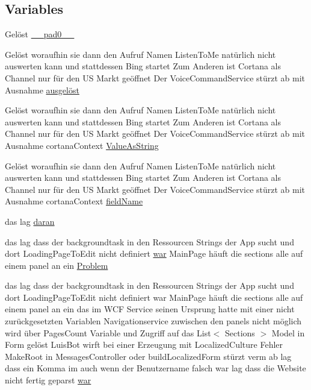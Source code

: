 \subsection*{Variables}
\begin{DoxyCompactItemize}
\item 
Gelöst \mbox{\hyperlink{_r_e_a_d_m_e_8txt_a38ccef022a886075e294ad30cbfcae20}{\+\_\+\+\_\+pad0\+\_\+\+\_\+}}
\item 
Gelöst woraufhin sie dann den Aufruf Namen Listen\+To\+Me natürlich nicht auswerten kann und stattdessen Bing startet Zum Anderen ist Cortana als Channel nur für den US Markt geöffnet Der Voice\+Command\+Service stürzt ab mit Ausnahme \mbox{\hyperlink{_r_e_a_d_m_e_8txt_ae87c321689a82617b1f79b2274e0c802}{ausgelöst}}
\item 
Gelöst woraufhin sie dann den Aufruf Namen Listen\+To\+Me natürlich nicht auswerten kann und stattdessen Bing startet Zum Anderen ist Cortana als Channel nur für den US Markt geöffnet Der Voice\+Command\+Service stürzt ab mit Ausnahme cortana\+Context \mbox{\hyperlink{_r_e_a_d_m_e_8txt_a5efed622080494c17160e34d1aa15886}{Value\+As\+String}}
\item 
Gelöst woraufhin sie dann den Aufruf Namen Listen\+To\+Me natürlich nicht auswerten kann und stattdessen Bing startet Zum Anderen ist Cortana als Channel nur für den US Markt geöffnet Der Voice\+Command\+Service stürzt ab mit Ausnahme cortana\+Context \mbox{\hyperlink{_r_e_a_d_m_e_8txt_a225ecf32ab26301c2eb46c45696e77a2}{field\+Name}}
\item 
das lag \mbox{\hyperlink{_r_e_a_d_m_e_8txt_a135543df2f8a787ac2ddeaf87194562c}{daran}}
\item 
das lag dass der backgroundtask in den Ressourcen Strings der App sucht und dort Loading\+Page\+To\+Edit nicht definiert \mbox{\hyperlink{_r_e_a_d_m_e_8txt_a2a72fc7da943588cba8c302409b22e53}{war}} Main\+Page häuft die sections alle auf einem panel an ein \mbox{\hyperlink{_r_e_a_d_m_e_8txt_a86dd00a8c1f3448e32e23bece4a957d6}{Problem}}
\item 
das lag dass der backgroundtask in den Ressourcen Strings der App sucht und dort Loading\+Page\+To\+Edit nicht definiert war Main\+Page häuft die sections alle auf einem panel an ein das im W\+CF Service seinen Ursprung hatte mit einer nicht zurückgesetzten Variablen Navigationservice zuwischen den panels nicht möglich wird über Pages\+Count Variable und Zugriff auf das List$<$ Sections $>$ Model in Form gelöst Luis\+Bot wirft bei einer Erzeugung mit Localized\+Culture Fehler Make\+Root in Messages\+Controller oder build\+Localized\+Form stürzt verm ab lag dass ein Komma im auch wenn der Benutzername falsch war lag dass die Website nicht fertig geparst \mbox{\hyperlink{_r_e_a_d_m_e_8txt_a2a72fc7da943588cba8c302409b22e53}{war}}

\end{DoxyCompactItemize}
